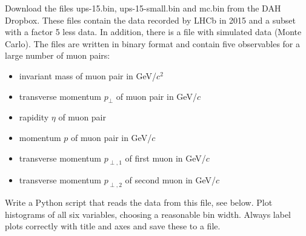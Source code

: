 \newpage
Download the files ups-15.bin, ups-15-small.bin and mc.bin from the DAH Dropbox.
These files contain the data recorded by LHCb in 2015 and a subset with a factor 5 less data. 
In addition, there is a file with simulated data (Monte Carlo).
The files are written in binary format and contain five observables for a large number of muon pairs:
\begin{itemize}
\item invariant mass of muon pair in GeV/$c^2$
\item transverse momentum $p_\perp$ of muon pair in GeV/$c$
\item rapidity $\eta$ of muon pair
\item momentum $p$ of muon pair in GeV/$c$
\item transverse momentum $p_{\perp,1}$ of first muon in GeV/$c$
\item transverse momentum $p_{\perp,2}$ of second muon in GeV/$c$
\end{itemize}

Write a Python script that reads the data from this file, see below.
Plot histograms of all six variables, choosing a reasonable bin width.
Always label plots correctly with title and axes and save these to a file. 


\vspace*{-0.5cm}


